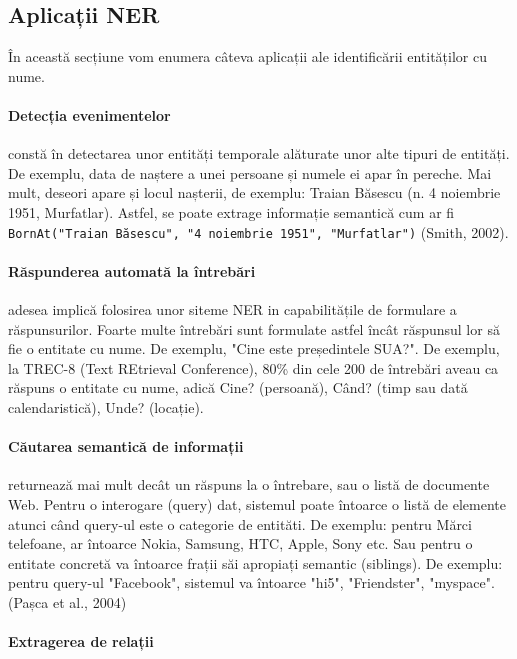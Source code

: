 \subsection{Aplicații NER}

În această secțiune vom enumera câteva aplicații ale identificării entităților cu nume.

\paragraph{Detecția evenimentelor}

constă în detectarea unor entități temporale alăturate unor alte tipuri de entități. De exemplu, data de naștere a unei persoane și numele ei apar în pereche. Mai mult, deseori apare și locul nașterii, de exemplu: Traian Băsescu (n. 4 noiembrie 1951, Murfatlar). Astfel, se poate extrage informație semantică cum ar fi \texttt{BornAt("Traian Băsescu", "4 noiembrie 1951", "Murfatlar")} (Smith, 2002).\cite{Smith02detectingand}

\paragraph{Răspunderea automată la întrebări}

adesea implică folosirea unor siteme NER in capabilitățile de formulare a răspunsurilor. Foarte multe întrebări sunt formulate astfel încât răspunsul lor să fie o entitate cu nume. De exemplu, "Cine este președintele SUA?". De exemplu, la TREC-8 (Text REtrieval Conference), 80\% din cele 200 de întrebări aveau ca răspuns o entitate cu nume, adică Cine? (persoană), Când? (timp sau dată calendaristică), Unde? (locație).\cite{trec8}

\paragraph{Căutarea semantică de informații}

returnează mai mult decât un răspuns la o întrebare, sau o listă de documente Web. Pentru o interogare (query) dat, sistemul poate întoarce o listă de elemente atunci când query-ul este o categorie de entităti. De exemplu: pentru Mărci telefoane, ar întoarce Nokia, Samsung, HTC, Apple, Sony etc. Sau pentru o entitate concretă va întoarce frații săi apropiați semantic (siblings). De exemplu: pentru query-ul "Facebook", sistemul va întoarce "hi5", "Friendster", "myspace". (Pașca et al., 2004)\cite{pasca2004}

\paragraph{Extragerea de relații}
\label{paragraph:relation}

